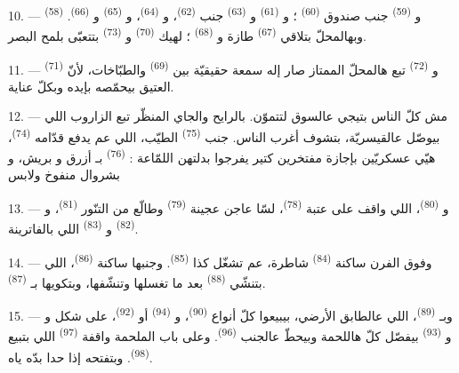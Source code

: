 10. ---  \textsuperscript{(58)} و
\textsuperscript{(59)} جنب صندوق 
\textsuperscript{(60)} ؛ و \textsuperscript{(61)}
و \textsuperscript{(63)} جنب 
\textsuperscript{(62)}، و \textsuperscript{(64)}،
و \textsuperscript{(65)} و
\textsuperscript{(66)}. وبهالمحلّ بتلاقي 
\textsuperscript{(67)} طازة و \textsuperscript{(68)} ؛
لهيك  \textsuperscript{(70)} و
\textsuperscript{(73)} بتتعبّى بلمح البصر.

11. --- و \textsuperscript{(72)} تبع هالمحلّ الممتاز صار
إله سمعة حقيقيّة بين  \textsuperscript{(69)}
والطبّاخات، لأنّ  \textsuperscript{(71)} العتيق بيحمّصه
بإيده وبكلّ عناية.

\VUsaut{4.0mm}
\VUsaut{3.0mm}

12. --- مش كلّ الناس بتيجي عالسوق لتتموّن. بالرايح والجاي المنظّر
تبع الزاروب اللي بيوصّل عالقيسريّة، بتشوف أغرب الناس. جنب
 \textsuperscript{(75)} الطيّب، اللي عم يدفع قدّامه
 \textsuperscript{(74)}، هيّي عسكريّين بإجازة
مفتخرين كتير يفرجوا بدلتهن اللمّاعة : 
\textsuperscript{(76)} بـ أزرق و بريش،
و بشروال منفوخ ولابس 

13. --- و \textsuperscript{(80)}، اللي واقف على عتبة
 \textsuperscript{(78)}، لسّا عاجن عجينة 
\textsuperscript{(79)} وطالّع من التنّور 
\textsuperscript{(81)}، و \textsuperscript{(82)}
و \textsuperscript{(83)} اللي بالفاترينة.

14. --- وفوق الفرن ساكنة  \textsuperscript{(84)}
شاطرة، عم تشغّل كذا  \textsuperscript{(85)}. وجنبها
ساكنة  \textsuperscript{(86)}، اللي بتنشّي
 \textsuperscript{(88)} بعد ما تغسلها وتنشّفها،
وبتكويها بـ \textsuperscript{(87)}.

\VUsaut{4.0mm}
\VUsaut{3.0mm}

15. --- وبـ \textsuperscript{(89)}، اللي عالطابق
الأرضي، بيبيعوا كلّ أنواع 
\textsuperscript{(90)}، و \textsuperscript{(94)} أو
 \textsuperscript{(92)}، على شكل  و و
\textsuperscript{(93)} بيفصّل كلّ هاللحمة وبيحطّ عالجنب  \textsuperscript{(96)}. وعلى باب الملحمة واقفة  \textsuperscript{(97)} اللي بتبيع 
\textsuperscript{(98)}. وبتفتحه إذا حدا بدّه ياه.

